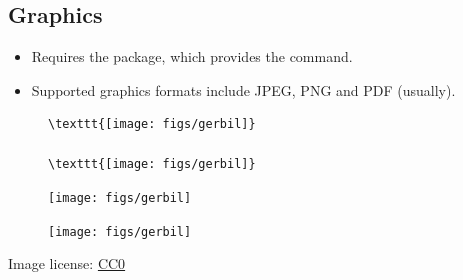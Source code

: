 \documentclass[aspectratio=169]{beamer}
\begin{document}



\subsection{Graphics}
\begin{frame}[fragile]{\insertsubsection}
\begin{itemize}
\item Requires the  package, which provides the
 command.
\item Supported graphics formats include JPEG, PNG and PDF (usually).
\end{itemize}
\begin{figure}
    \begin{minipage}{0.5\textwidth}
        \begin{lstlisting}
\texttt{[image: figs/gerbil]}

\texttt{[image: figs/gerbil]}
        \end{lstlisting}
    \end{minipage}
    \begin{minipage}{0.4\textwidth}
        \texttt{[image: figs/gerbil]}

        \texttt{[image: figs/gerbil]}
    \end{minipage}
\end{figure}

\tiny{Image license: \href{https://pixabay.com/en/animal-apple-attractive-beautiful-1239390/}{CC0}}
\end{frame}
\end{document}

